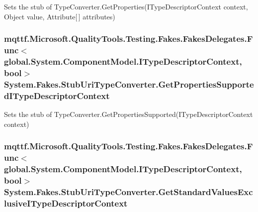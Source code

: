 Sets the stub of Type\-Converter.\-Get\-Properties(\-I\-Type\-Descriptor\-Context context, Object value, Attribute\mbox{[}$\,$\mbox{]} attributes)

\hypertarget{class_system_1_1_fakes_1_1_stub_uri_type_converter_a2e48bfcf3defbb949743bd72f18f6457}{
\subsubsection[{Get\-Properties\-Supported\-I\-Type\-Descriptor\-Context}]{\setlength{\rightskip}{0pt plus 5cm}mqttf.\-Microsoft.\-Quality\-Tools.\-Testing.\-Fakes.\-Fakes\-Delegates.\-Func$<$global.\-System.\-Component\-Model.\-I\-Type\-Descriptor\-Context, bool$>$ System.\-Fakes.\-Stub\-Uri\-Type\-Converter.\-Get\-Properties\-Supported\-I\-Type\-Descriptor\-Context}}\label{class_system_1_1_fakes_1_1_stub_uri_type_converter_a2e48bfcf3defbb949743bd72f18f6457}


Sets the stub of Type\-Converter.\-Get\-Properties\-Supported(\-I\-Type\-Descriptor\-Context context)

\hypertarget{class_system_1_1_fakes_1_1_stub_uri_type_converter_a6cf1ab74cb43aef3d10f39f85e7adf45}{
\subsubsection[{Get\-Standard\-Values\-Exclusive\-I\-Type\-Descriptor\-Context}]{\setlength{\rightskip}{0pt plus 5cm}mqttf.\-Microsoft.\-Quality\-Tools.\-Testing.\-Fakes.\-Fakes\-Delegates.\-Func$<$global.\-System.\-Component\-Model.\-I\-Type\-Descriptor\-Context, bool$>$ System.\-Fakes.\-Stub\-Uri\-Type\-Converter.\-Get\-Standard\-Values\-Exclusive\-I\-Type\-Descriptor\-Context}}\label{class_system_1_1_fakes_1_1_stub_uri_type_converter_a6cf1ab74cb43aef3d10f39f85e7adf45}


